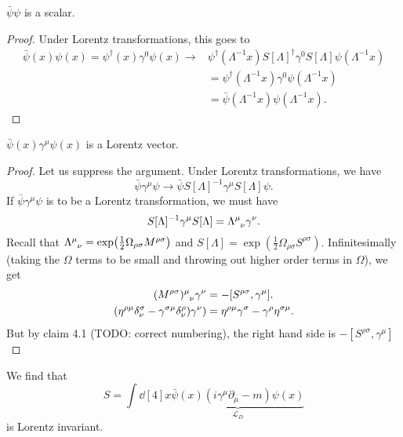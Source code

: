 \begin{claim}
  $\bar \psi \psi$ is a scalar.
\end{claim}
\begin{proof}
  Under Lorentz transformations, this goes to
  \begin{align}
    \bar\psi(x)\psi(x) = \psi^{\dagger}(x) \gamma^0 \psi(x) \to &\psi^{\dagger}(\Lambda^{-1} x) S[\Lambda]^{\dagger} \gamma^0 S[\Lambda] \psi(\Lambda^{-1} x) \\
								&= \psi^{\dagger}(\Lambda^{-1} x)\gamma^0 \psi(\Lambda^{-1} x) \\
								&= \bar \psi(\Lambda^{-1} x) \psi(\Lambda^{-1} x).
  \end{align}
\end{proof}
\begin{claim}
  $\bar \psi(x) \gamma^{\mu} \psi(x)$ is a Lorentz vector.
\end{claim}
\begin{proof}
  Let us suppress the argument. Under Lorentz transformations, we have
  \begin{equation}
    \bar\psi \gamma^{\mu} \psi \to \bar\psi S[\Lambda]^{-1} \gamma^{\mu} S[\Lambda]\psi.
  \end{equation}
  If $\bar\psi \gamma^{\mu} \psi$ is to be a Lorentz transformation, we must have
  \begin{equation}
    \label{eq:14-1}
    S[\Lambda]^{-1} \gamma^{\mu} S[\Lambda] = \Lambda \indices{^{\mu}_{\nu}} \gamma^{\nu}.
  \end{equation}
  Recall that $\Lambda \indices{^{\mu}_{\nu}} = \exp(\frac{1}{2} \Omega_{\rho\sigma} M^{\rho\sigma})$ and $S[\Lambda] = \exp(\frac{1}{2} \Omega_{\rho\sigma} S^{\rho\sigma})$.
  Infinitesimally (taking the $\Omega$ terms to be small and throwing out higher order terms in $\Omega$), we get
  \begin{align}
    (M^{\rho\sigma}) \indices{^{\mu}_{\nu}} \gamma^{\nu} &= - [S^{\rho\sigma}, \gamma^{\mu}]. \\
    (\eta^{\rho\mu} \delta^{\sigma}_{\nu} - \gamma^{\sigma\mu} \delta^{\rho}_{\nu}) \gamma^{\nu}) &= \eta^{\rho\mu} \gamma^{\sigma} - \gamma^{\rho} \eta^{\sigma\mu}.
  \end{align}
  But by claim 4.1 (TODO: correct numbering), the right hand side is $-[S^{\rho\sigma}, \gamma^{\mu}]$
\end{proof}
We find that
\begin{equation}
  \boxed{ S = \int \dd[4]{x} \underbrace{\bar\psi(x) (i \gamma^{\mu} \partial_{\mu} - m) \psi(x)}_{\mathcal{L}_D} }
\end{equation}
is Lorentz invariant.


